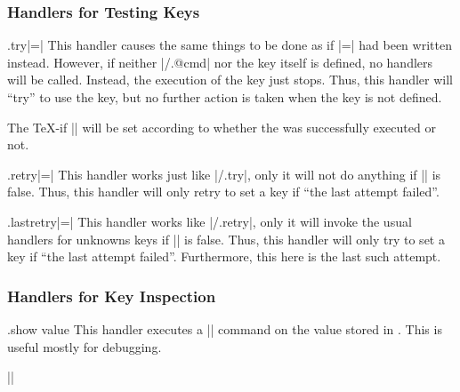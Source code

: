 \subsubsection{Handlers for Testing Keys}

\begin{handler}{{.try}|=|}
    This handler causes the same things to be done as if
    |=| had been written instead. However, if neither
    |/.@cmd| nor the key itself is defined, no handlers will be
    called. Instead, the execution of the key just stops. Thus, this handler
    will ``try'' to use the key, but no further action is taken when the key is
    not defined.

    The \TeX-if |\ifpgfkeyssuccess| will be set according to whether the
     was successfully executed or not.
\begin{codeexample}[]
\end{codeexample}
\end{handler}

\begin{handler}{{.retry}|=|}
    This handler works just like |/.try|, only it will not do anything if
    |\ifpgfkeyssuccess| is false. Thus, this handler will only retry to set a
    key if ``the last attempt failed''.
\begin{codeexample}[]
\end{codeexample}
\end{handler}

\begin{handler}{{.lastretry}|=|}
    This handler works like |/.retry|, only it will invoke the usual handlers
    for unknowns keys if |\ifpgfkeyssuccess| is false. Thus, this handler
    will only try to set a key if ``the last attempt failed''. Furthermore,
    this here is the last such attempt.
\end{handler}


\subsubsection{Handlers for Key Inspection}

\begin{handler}{{.show value}}
    This handler executes a |\show| command on the value stored in .
    This is useful mostly for debugging.

    \example ||
\end{handler}

